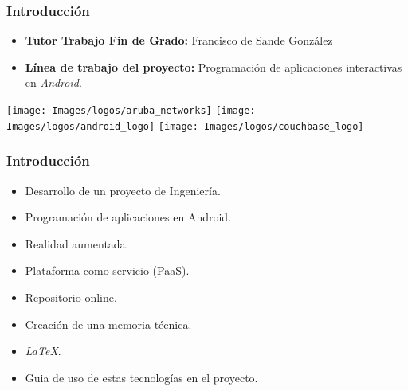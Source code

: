 \begin{frame}
    \frametitle{Introducción}
    \begin{itemize}
	\item \textbf{Tutor Trabajo Fin de Grado:} Francisco de Sande González
        \item \textbf{Línea de trabajo del proyecto:} Programación de aplicaciones interactivas en {\it Android}.
    \end{itemize}
        {\inserttitlegraphic\par}
		\vfill \texttt{[image: Images/logos/aruba\_networks]}
		\hfill %
		\texttt{[image: Images/logos/android\_logo]}
		\hfill \texttt{[image: Images/logos/couchbase\_logo]}
\end{frame}
\begin{frame}
	\frametitle{Introducción}
		\begin{itemize}
			\item Desarrollo de un proyecto de Ingeniería.
			\item Programación de aplicaciones en Android.
			\item Realidad aumentada.
			\item Plataforma como servicio (PaaS).
			\item Repositorio online.
			\item Creación de una memoria técnica.
			\item \textit{LaTeX}.
			\item Guia de uso de estas tecnologías en el proyecto.
		\end{itemize}
	\endblock{}	
\end{frame}  
